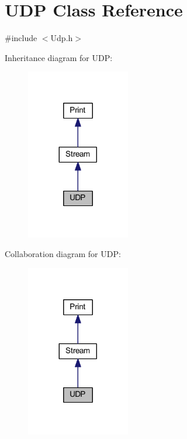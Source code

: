 \hypertarget{class_u_d_p}{}\section{U\+D\+P Class Reference}
\label{class_u_d_p}


{\ttfamily \#include $<$Udp.\+h$>$}



Inheritance diagram for U\+D\+P\+:\nopagebreak
\begin{figure}[H]
\begin{center}
\leavevmode
\includegraphics[width=128pt]{class_u_d_p__inherit__graph}
\end{center}
\end{figure}


Collaboration diagram for U\+D\+P\+:\nopagebreak
\begin{figure}[H]
\begin{center}
\leavevmode
\includegraphics[width=128pt]{class_u_d_p__coll__graph}
\end{center}
\end{figure}
